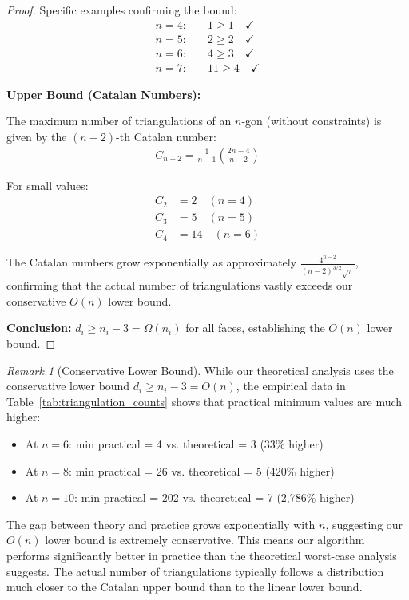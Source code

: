 \documentclass[12pt,a4paper]{article}
\theoremstyle{definition}
\theoremstyle{remark}
\newtheorem{remark}{Remark}
\begin{document}
\begin{proof}
Specific examples confirming the bound:
\begin{align}
n = 4: &\quad 1 \geq 1 \quad \checkmark \\
n = 5: &\quad 2 \geq 2 \quad \checkmark \\
n = 6: &\quad 4 \geq 3 \quad \checkmark \\
n = 7: &\quad 11 \geq 4 \quad \checkmark
\end{align}

\textbf{Upper Bound (Catalan Numbers):}

The maximum number of triangulations of an $n$-gon (without constraints) is given by the $(n-2)$-th Catalan number:
\begin{align}
C_{n-2} = \frac{1}{n-1}\binom{2n-4}{n-2}
\end{align}

For small values:
\begin{align}
C_2 &= 2 \quad (n = 4) \\
C_3 &= 5 \quad (n = 5) \\
C_4 &= 14 \quad (n = 6)
\end{align}

The Catalan numbers grow exponentially as approximately $\frac{4^{n-2}}{(n-2)^{3/2}\sqrt{\pi}}$, confirming that the actual number of triangulations vastly exceeds our conservative $O(n)$ lower bound.

\textbf{Conclusion:} $d_i \geq n_i - 3 = \Omega(n_i)$ for all faces, establishing the $O(n)$ lower bound.
\end{proof}

\begin{remark}[Conservative Lower Bound]
While our theoretical analysis uses the conservative lower bound $d_i \geq n_i - 3 = O(n)$, the empirical data in Table~\ref{tab:triangulation_counts} shows that practical minimum values are much higher:
\begin{itemize}
    \item At $n = 6$: min practical = 4 vs. theoretical = 3 (33\% higher)
    \item At $n = 8$: min practical = 26 vs. theoretical = 5 (420\% higher)
    \item At $n = 10$: min practical = 202 vs. theoretical = 7 (2,786\% higher)
\end{itemize}

The gap between theory and practice grows exponentially with $n$, suggesting our $O(n)$ lower bound is extremely conservative. This means our algorithm performs significantly better in practice than the theoretical worst-case analysis suggests. The actual number of triangulations typically follows a distribution much closer to the Catalan upper bound than to the linear lower bound.
\end{remark}
\end{document}

